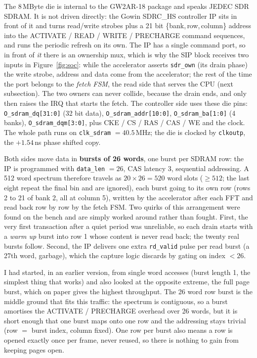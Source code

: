 \documentclass[a4paper,11pt]{article}
\begin{document}
The 8\,MByte die is internal to the GW2AR-18 package and speaks JEDEC SDR SDRAM. It
is not driven directly: the Gowin SDRC\_HS controller IP sits in front of it and
turns read/write strobes plus a 21 bit \{bank,\,row,\,column\} address into the
ACTIVATE / READ / WRITE / PRECHARGE command sequences, and runs the periodic
refresh on its own. The IP has a single command port, so in front of \emph{it}
there is an ownership mux, which is why the SIP block receives two inputs in
Figure~\ref{fig:soc}: while the accelerator asserts \texttt{sdr\_own} (its drain
phase) the write strobe, address and data come from the accelerator; the rest of
the time the port belongs to the \emph{fetch FSM}, the read side that serves the
CPU (next subsection). The two owners can never collide, because the drain ends,
and only then raises the IRQ that starts the fetch. The controller side uses
these die pins: \texttt{O\_sdram\_dq[31:0]} (32 bit data),
\texttt{O\_sdram\_addr[10:0]}, \texttt{O\_sdram\_ba[1:0]} (4 banks),
\texttt{O\_sdram\_dqm[3:0]}, plus CKE / CS / RAS / CAS / WE and the clock. The whole
path runs on \texttt{clk\_sdram} $=40.5$\,MHz; the die is clocked by
\texttt{clkoutp}, the $+1.54$\,ns phase shifted copy.

Both sides move data in \textbf{bursts of 26 words}, one burst per SDRAM row: the
IP is programmed with \texttt{data\_len} $= 26$, CAS latency 3, sequential
addressing. A 512 word spectrum therefore travels as $20 \times 26 = 520$ word
slots ($\geq 512$; the last eight repeat the final bin and are ignored), each
burst going to its own row (rows 2 to 21 of bank 2, all at column 5), written by
the accelerator after each FFT and read back row by row by the fetch FSM. Two
quirks of this arrangement were found on the bench and are simply worked around
rather than fought. First, the very first transaction after a quiet period was
unreliable, so each drain starts with a \emph{warm up} burst into row 1 whose
content is never read back; the twenty real bursts follow. Second, the IP
delivers one extra \texttt{rd\_valid} pulse per read burst (a 27th word, garbage),
which the capture logic discards by gating on index $< 26$.

I had started, in an earlier version, from single word accesses (burst length 1,
the simplest thing that works) and also looked at the opposite extreme, the full
page burst, which on paper gives the highest throughput. The 26 word row burst is
the middle ground that fits this traffic: the spectrum is contiguous, so a burst
amortises the ACTIVATE / PRECHARGE overhead over 26 words, but it is short enough
that one burst maps onto one row and the addressing stays trivial (row $=$ burst
index, column fixed). One row per burst also means a row is opened exactly once
per frame, never reused, so there is nothing to gain from keeping pages open.
\end{document}
